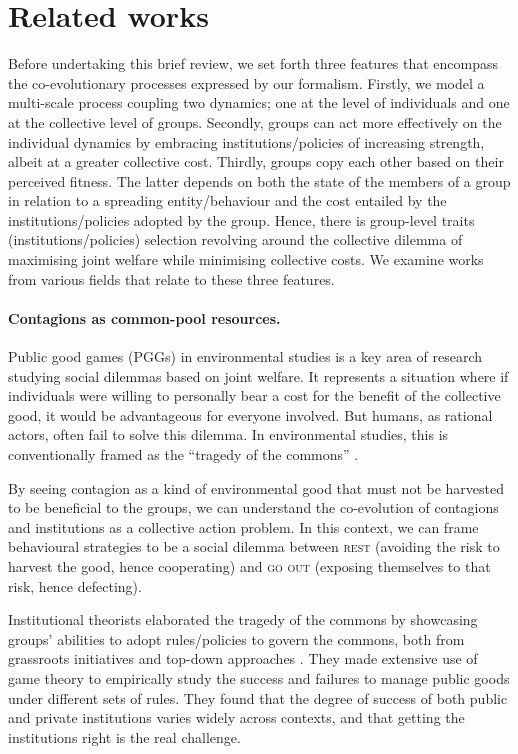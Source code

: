 \section{Related works}
\label{coevo.section.related}

Before undertaking this brief review, we set forth three features that encompass the co-evolutionary processes expressed by our formalism. 
Firstly, we model a multi-scale process coupling two dynamics; one at the level of individuals and one at the collective level of groups.
Secondly, groups can act more effectively on the individual dynamics by embracing institutions/policies of increasing strength, albeit at a greater collective cost.
Thirdly, groups copy each other based on their perceived fitness. The latter depends on both the state of the members of a group in relation to a spreading entity/behaviour and the cost entailed by the institutions/policies adopted by the group. Hence, there is group-level traits (institutions/policies) selection revolving around the collective dilemma of maximising joint welfare while minimising collective costs.
We examine works from various fields that relate to these three features. 

\paragraph*{Contagions as common-pool resources.} Public good games (PGGs) in environmental studies is a key area of research studying social dilemmas based on joint welfare. It represents a situation where if individuals were willing to personally bear a cost for the benefit of the collective good, it would be advantageous for everyone involved. But humans, as rational actors, often fail to solve this dilemma. In environmental studies, this is conventionally framed as the ``tragedy of the commons'' \cite{olson_logic_1971, hardin_collective_1982, ostrom_governing_1990}.

By seeing contagion as a kind of environmental good that must not be harvested to be beneficial to the groups, we can understand the co-evolution of contagions and institutions as a collective action problem. In this context, we can frame behavioural strategies to be a social dilemma between \textsc{rest} (avoiding the risk to harvest the good, hence cooperating) and \textsc{go out} (exposing themselves to that risk, hence defecting). 

Institutional theorists elaborated the tragedy of the commons by showcasing groups' abilities to adopt rules/policies to govern the commons, both from grassroots initiatives and top-down approaches \cite{ostrom_governing_1990}. They made extensive use of game theory to empirically study the success and failures to manage public goods under different sets of rules. They found that the degree of success of both public and private institutions varies widely across contexts, and that getting the institutions right is the real challenge. 

